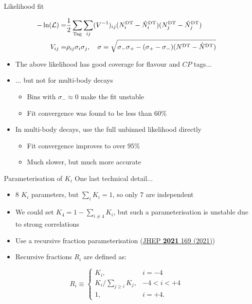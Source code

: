 \documentclass{beamer}
\begin{document}
\begin{frame}{Likelihood fit}
  \vspace{-0.5cm}
  \begin{center}
    \begin{align*}
      -\ln(\mathcal{L}) =& \frac{1}{2}\sum_{\rm Tag}\sum_{ij}(V^{-1})_{ij}(N^{\rm DT}_i - \hat{N}^{\rm DT}_i)(N^{\rm DT}_j - \hat{N}^{\rm DT}_j) \\
      V_{ij} =& \rho_{ij}\sigma_i\sigma_j, \quad \sigma = \sqrt{\sigma_-\sigma_+ - (\sigma_+ - \sigma_-)(N^{\rm DT} - \hat{N}^{\rm DT})}
    \end{align*}
  \end{center}
  \begin{itemize}
    \setlength\itemsep{1.0em}
    \item{The above likelihood has good coverage for flavour and $C\!P$ tags...}
    \item{... but not for multi-body decays}
    \begin{itemize}
      \item{Bins with $\sigma_-\approx0$ make the fit unstable}
      \item{Fit convergence was found to be less than $60\%$}
    \end{itemize}
    \item{In multi-body decays, use the full unbinned likelihood directly}
    \begin{itemize}
      \item{Fit convergence improves to over $95\%$}
      \item{Much slower, but much more accurate}
    \end{itemize}
  \end{itemize}
\end{frame}

\begin{frame}{Parameterisation of $K_i$}
  \vspace{0.0cm}
  {\Large One last technical detail...}
  \begin{itemize}
    \item{$8$ $K_i$ parameters, but $\sum_iK_i = 1$, so only $7$ are independent}
    \item{We could set $K_4 = 1 - \sum_{i\neq4}K_i$, but such a parameterisation is unstable due to strong correlations}
    \item{Use a recursive fraction parameterisation (\href{https://link.springer.com/article/10.1007/JHEP02(2021)169}{JHEP \textbf{2021} 169 (2021)})}
    \item{Recursive fractions $R_i$ are defined as:}
  \end{itemize}
  \begin{center}
    \begin{equation*}
      R_i \equiv
      \begin{cases}
        K_i, & i = -4 \\
        K_i/\sum_{j\geq i}K_j, & -4 < i < +4 \\
        1, &i = +4.
      \end{cases}
    \end{equation*}
  \end{center}
\end{frame}
\end{document}
